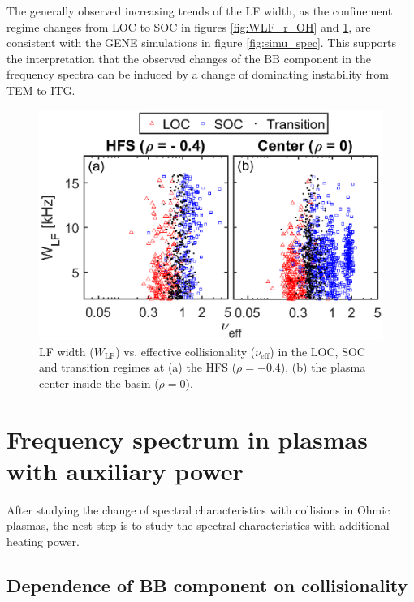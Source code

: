 The generally observed increasing trends of the LF width, as the confinement regime changes from LOC to SOC in figures \ref{fig:WLF_r_OH} and \ref{fig:WLF_nu_OH}, are consistent with the GENE simulations in figure \ref{fig:simu_spec}. This supports the interpretation that the observed changes of the BB component in the frequency spectra can be induced by a change of dominating instability from TEM to ITG.


\begin{figure}[h]
\begin{centering}
\includegraphics[scale=0.8]{fig_WLF_nu_r0_HFS_OH.eps}
\par\end{centering}
\caption{LF width ($W_\mathrm{LF}$) vs. effective collisionality ($\nu_\mathrm{eff}$) in the LOC, SOC and transition regimes at (a) the HFS ($\rho = -0.4$), (b) the plasma center inside the basin ($\rho = 0$).}
\label{fig:WLF_nu_OH}
\end{figure}


\section{Frequency spectrum in plasmas with auxiliary power} \label{sec:spec_Lmode}


After studying the change of spectral characteristics with collisions in Ohmic plasmas, the nest step is to study the spectral characteristics with additional heating power.


\subsection{Dependence of BB component on collisionality}

